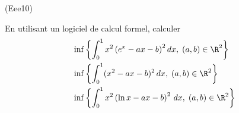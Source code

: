 \begin{tiny}(Eee10)\end{tiny}
En utilisant un logiciel de calcul formel, calculer
\begin{align*}
 &\inf \left\lbrace \int_{0}^{1}x^2 \left( e^{x} -ax -b \right)^2 dx,\; (a,b)\in \R^2 \right\rbrace \\
 &\inf \left\{ \int_{0}^{1}(x^{2}-ax-b)^{2}\,dx,\;(a,b)\in \R^{2}\right\} \\
 &\inf \left\lbrace \int_{0}^{1}x^2 \left( \ln x -ax -b\right)^2\, dx,\; (a,b)\in \R^2 \right\rbrace 
\end{align*}

